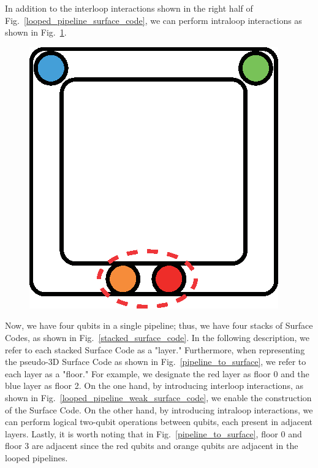 \documentclass[a4paper,11pt]{ltjsarticle}
\begin{document}
{{        In addition to the interloop interactions shown in the right half of Fig.~\ref{looped_pipeline_surface_code}, we can perform intraloop interactions as shown in Fig.~\ref{intraloop_interaction}.

        \begin{figure}[h]
            \centering
            \includegraphics[scale=0.50]{figure/intraloop_interaction.eps}
            \vspace{0pt}\caption{}
            \label{intraloop_interaction}
            \vspace{-10pt}
        \end{figure}

        Now, we have four qubits in a single pipeline; thus, we have four stacks of Surface Codes, as shown in Fig.~\ref{stacked_surface_code}. In the following description, we refer to each stacked Surface Code as a "layer." Furthermore, when representing the pseudo-3D Surface Code as shown in Fig.~\ref{pipeline_to_surface}, we refer to each layer as a "floor." For example, we designate the red layer as floor 0 and the blue layer as floor 2. On the one hand, by introducing interloop interactions, as shown in Fig.~\ref{looped_pipeline_weak_surface_code}, we enable the construction of the Surface Code. On the other hand, by introducing intraloop interactions, we can perform logical two-qubit operations between qubits, each present in adjacent layers. Lastly, it is worth noting that in Fig.~\ref{pipeline_to_surface}, floor 0 and floor 3 are adjacent since the red qubits and orange qubits are adjacent in the looped pipelines.

}}
\end{document}
